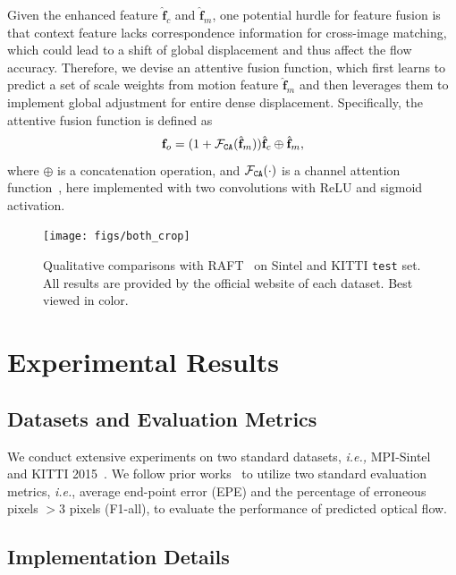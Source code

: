 \documentclass[letterpaper]{article} %
\begin{document}
Given the enhanced feature $\hat{\mathbf f}_c$ and $\hat{\mathbf f}_m$, one potential hurdle for feature fusion is that context feature lacks correspondence information for cross-image matching, which could lead to a shift of global displacement and thus affect the flow accuracy. Therefore, we devise an attentive fusion function, which first learns to predict a set of scale weights from motion feature $\hat{\mathbf f}_m$ and then leverages them to implement global adjustment for entire dense displacement. Specifically, the attentive fusion function is defined as
\begin{equation}
	{\mathbf f}_o = (1+{\cal F}_{\tt CA}(\hat{\mathbf f}_m)) \hat{\mathbf f}_c \oplus \hat{\mathbf f}_m,
\end{equation}
where $\oplus$ is a concatenation operation, and ${\cal F}_{\tt CA}(\cdot)$ is a channel attention function~\cite{Hu2020SqueezeandExcitationN}, here implemented with two convolutions with ReLU and sigmoid activation.

\begin{figure}[ht]
	\begin{center}
		\texttt{[image: figs/both\_crop]}
	\end{center}
	\caption{Qualitative comparisons with RAFT~\cite{Teed2020RAFTRA} on Sintel and KITTI {\tt test} set. All results are provided by the official website of each dataset. Best viewed in color.}
	\label{fig:both}
\end{figure}


\section{Experimental Results}

\subsection{Datasets and Evaluation Metrics}

We conduct extensive experiments on two standard datasets, {\em i.e.,} MPI-Sintel~\cite{Butler2012} and KITTI 2015~\cite{KITTI_2015}. We follow prior works~\cite{Teed2020RAFTRA, Jiang2021LearningOF} to utilize two standard evaluation metrics, {\em i.e.}, average end-point error (EPE) and the percentage of erroneous pixels $> 3$ pixels (F1-all), to evaluate the performance of predicted optical flow.

\subsection{Implementation Details}
\end{document}
